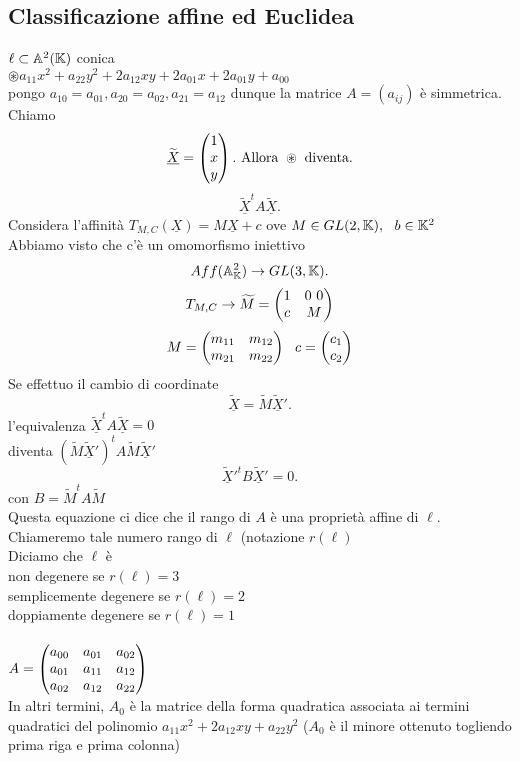 \documentclass[12px]{article}
\begin{document}
\subsection{Classificazione affine ed Euclidea}
	$\ell \subset \mathbb{A}^2(\mathbb{K}) $ conica\\
	$\circledast a_{11}x^2 + a_{22}y^2 + 2a_{12}xy + 2a_{01}x + 2a_{01}y + a_{00}$\\
	pongo $a_{10}=a_{01}, a_{20}=a_{02},a_{21}=a_{12}$ dunque la matrice $A=(a_{ij})$ è simmetrica. Chiamo
	\[
		\widetilde{\underline X} = \begin{pmatrix}1\\x\\y\end{pmatrix}. \text{ Allora } \circledast \text{ diventa}
	.\] 
	\[
	\underline{\widetilde{X}}^t A\underline{\widetilde{X}}
	.\] 
	Considera l'affinità $T_{M,C}(\underline X ) = M\underline X + c$ ove  $M\in GL(2,\mathbb{K}), \ \ b\in \mathbb{K}^2$\\
	Abbiamo visto che c'è un omomorfismo iniettivo 
	\[
	Aff(\mathbb{A}^2_{\mathbb{K}}) \rightarrow GL(3,\mathbb{K})
	.\] 
	\[
		T_{M,C} \rightarrow \widetilde M = \begin{pmatrix} 1 & 0\ 0\\ c & M \end{pmatrix}
	\] 
	\[
		M = \begin{pmatrix}m_{11}&m_{12}\\m_{21}&m_{22}\end{pmatrix} \ \ c = \begin{pmatrix}c_1\\c_2\end{pmatrix}
	\] 
	Se effettuo il cambio di coordinate
	\[
		\widetilde{\underline{X}} = \widetilde{M}\widetilde{\underline{X}}'
	.\] 
	l'equivalenza $\widetilde{\underline{X}}^t A \widetilde{\underline{X}} = 0$ \\
	diventa  $(\widetilde M\widetilde{\underline{X}}')^t A \widetilde{M}\widetilde{\underline {X}}'$ \\
	\[
	\widetilde{\underline{X}}'^t B \widetilde{\underline{X}}'= 0
	.\] 
	con $B = \widetilde{M}^t A\widetilde{M}$\\
	Questa equazione ci dice che il rango di  $A$ è una proprietà affine di $\ell$. Chiameremo tale numero rango di $\ell$ (notazione $r(\ell)$\\
	Diciamo che  $\ell$ è\\
	non degenere se $r(\ell) = 3$\\
	semplicemente degenere se  $r(\ell) = 2$\\
	doppiamente degenere se  $r(\ell) = 1$
	\ \\ \hline \ \\
	$A = \begin{pmatrix}a_{00}&a_{01} & a_{02}\\a_{01} & a_{11} & a_{12} \\ a_{02} & a_{12} & a_{22}\end{pmatrix}$ \\In altri termini, $A_0$ è la matrice della forma quadratica associata ai termini quadratici del polinomio $a_{11}x^2 + 2a_{12}xy + a_{22}y^ 2$ ($A_0$ è il minore ottenuto togliendo prima riga e prima colonna)\\
\end{document}
